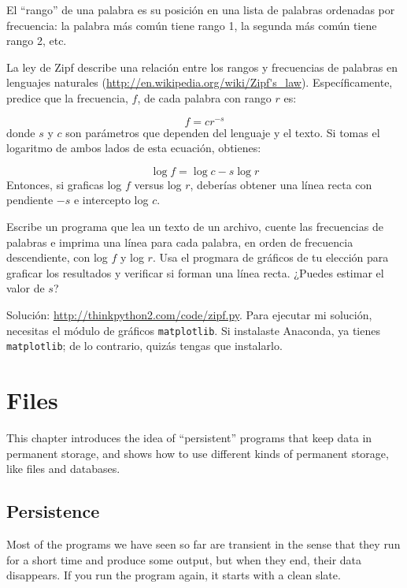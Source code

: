 \documentclass[10pt]{book}
\begin{document}
\begin{exercise}

El ``rango'' de una palabra es su posición en una lista de palabras
ordenadas por frecuencia: la palabra más común tiene rango 1, la
segunda más común tiene rango 2, etc.

La ley de Zipf describe una relación entre los rangos y frecuencias de
palabras en lenguajes naturales
(\url{http://en.wikipedia.org/wiki/Zipf's_law}).  Específicamente,
predice que la frecuencia, $f$, de cada palabra con rango $r$ es:

\[ f = c r^{-s} \]
%
donde $s$ y $c$ son parámetros que dependen del lenguaje y el
texto.  Si tomas el logaritmo de ambos lados de esta ecuación,
obtienes:

\[ \log f = \log c - s \log r \]
%
Entonces, si graficas log $f$ versus log $r$, deberías obtener
una línea recta con pendiente $-s$ e intercepto log $c$.

Escribe un programa que lea un texto de un archivo, cuente
las frecuencias de palabras e imprima una línea
para cada palabra, en orden de frecuencia descendiente, con
log $f$ y log $r$.  Usa el progmara de gráficos de tu
elección para graficar los resultados y verificar si forman
una línea recta.  ¿Puedes estimar el valor de $s$?

Solución: \url{http://thinkpython2.com/code/zipf.py}.
Para ejecutar mi solución, necesitas el módulo de gráficos {\tt matplotlib}.
Si instalaste Anaconda, ya tienes {\tt matplotlib};
de lo contrario, quizás tengas que instalarlo.

\end{exercise}



\chapter{Files}

This chapter introduces the idea of ``persistent'' programs that
keep data in permanent storage, and shows how to use different
kinds of permanent storage, like files and databases.


\section{Persistence}

Most of the programs we have seen so far are transient in the
sense that they run for a short time and produce some output,
but when they end, their data disappears.  If you run the program
again, it starts with a clean slate.
\end{document}
